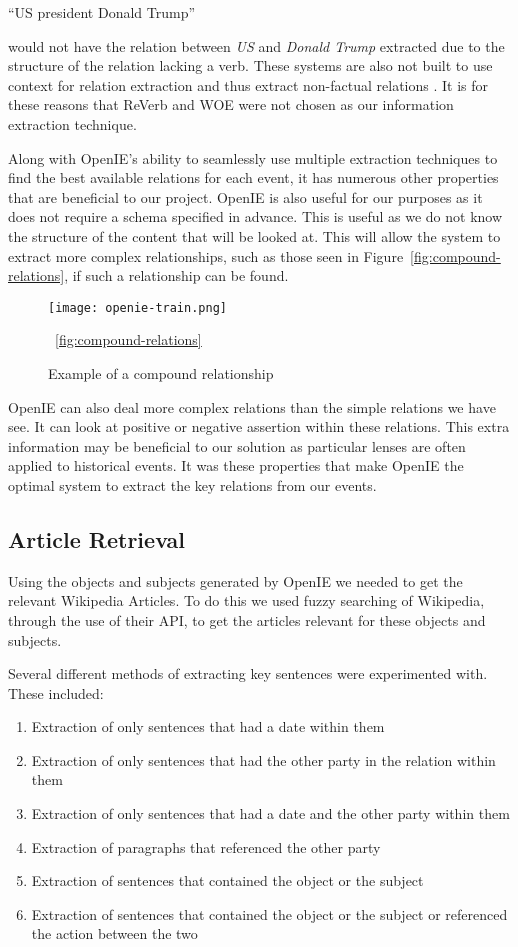 \documentclass[bsc,frontabs,twoside,singlespacing,parskip,deptreport]{infthesis}     %
\begin{document}
``US president Donald Trump''

would not have the relation between \textit{US} and \textit{Donald Trump} extracted due to the structure of the relation lacking a verb.
These systems are also not built to use context for relation extraction and thus extract non-factual relations \cite{schmitz2012open}.
It is for these reasons that ReVerb and WOE were not chosen as our information extraction technique.


Along with OpenIE's ability to seamlessly use multiple extraction techniques to find the best available
relations for each event, it has numerous other properties that are beneficial to our project.
OpenIE is also useful for our purposes as it does not require a schema specified in advance.
This is useful as we do not know the structure of the content that will be looked at.
This will allow the system to extract
more complex relationships, such as those seen in Figure~\ref{fig:compound-relations}, if such
a relationship can be found.


\begin{figure}[h]
  \centering
  \texttt{[image: openie-train.png]}
  \caption{Example of a compound relationship \cite{OpenIE}}
 ~\ref{fig:compound-relations}
  \end{figure}

OpenIE can also deal more complex relations  than the simple relations we have see.
It can look at positive or negative assertion within these relations.
This extra information may be beneficial to our solution as particular lenses are often applied to historical events.
It was these properties that make OpenIE the optimal system to extract the key relations from our events.


\subsection{Article Retrieval}
Using the objects and subjects generated by OpenIE we needed to get the relevant Wikipedia Articles.
To do this we used fuzzy searching of Wikipedia, through the use of their API, to get the articles relevant
for these objects and subjects.

Several different methods of extracting key sentences were experimented with.
These included:
\begin{enumerate}
  \item Extraction of only sentences that had a date within them
  \item Extraction of only sentences that had the other party in the relation within them
  \item Extraction of only sentences that had a date and the other party within them
  \item Extraction of paragraphs that referenced the other party
  \item Extraction of sentences that contained the object or the subject 
  \item Extraction of sentences that contained the object or the subject or referenced the action between the two 
\end{enumerate}
\end{document}

